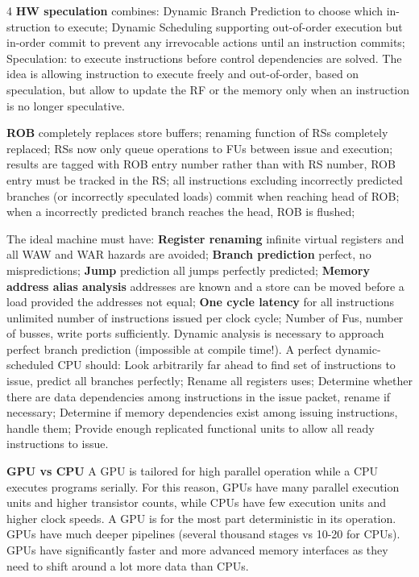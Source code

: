 \documentclass[a4paper,landscape]{article}
\begin{document}
\begin{multicols}{4}
\noindent \textbf{HW speculation} combines: Dynamic Branch Prediction to choose which in- struction to execute; Dynamic Scheduling supporting out-of-order execution but in-order commit to prevent any irrevocable actions until an instruction commits; Speculation: to execute instructions before control dependencies are solved. The idea is allowing instruction to execute freely and out-of-order, based on speculation, but allow to update the RF or the memory only when an instruction is no longer speculative.


\noindent \textbf{ROB} completely replaces store buffers; renaming function of RSs completely replaced; RSs now only queue operations to FUs between issue and execution; results are tagged with ROB entry number rather than with RS number, ROB entry must be tracked in the RS; all instructions excluding incorrectly predicted branches (or incorrectly speculated loads) commit when reaching head of ROB; when a incorrectly predicted branch reaches the head, ROB is flushed;

\noindent The ideal machine must have:
\textbf{Register renaming} infinite virtual registers and all WAW and WAR hazards are avoided;
\textbf{Branch prediction} perfect, no mispredictions; \textbf{Jump} prediction all jumps perfectly predicted; \textbf{Memory address alias analysis} addresses are known and a store can be moved before a load provided the addresses not equal; \textbf{One cycle latency} for all instructions unlimited number of instructions issued per clock cycle; Number of Fus, number of busses, write ports sufficiently. Dynamic analysis is necessary to approach perfect branch prediction (impossible at compile time!). A perfect dynamic-scheduled CPU should: Look arbitrarily far ahead to find set of instructions to issue, predict all branches perfectly; Rename all registers uses; Determine whether there are data dependencies among instructions in the issue packet, rename if necessary; Determine if memory dependencies exist among issuing instructions, handle them; Provide enough replicated functional units to allow
all ready instructions to issue.



\noindent \textbf{GPU vs CPU} A GPU is tailored for high parallel operation while a CPU executes programs serially. For this reason, GPUs have many parallel execution units and higher transistor counts, while CPUs have few execution units and higher clock speeds. A GPU is for the most part deterministic in its operation. GPUs have much deeper pipelines (several thousand stages vs 10-20 for CPUs). GPUs have significantly faster and more advanced memory interfaces as they need to shift around a lot more data than CPUs.


\end{multicols}
\end{document}
